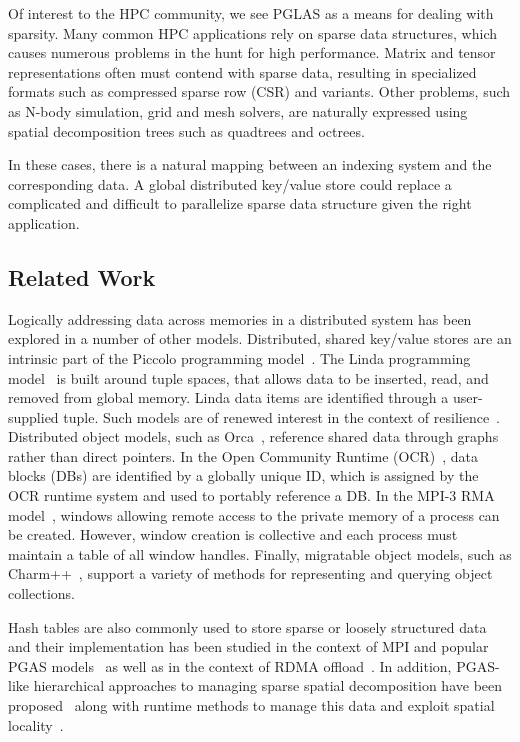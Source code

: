 Of interest to the HPC community, we see PGLAS as a
means for dealing with sparsity. Many common HPC applications rely on
sparse data structures, which causes numerous problems in the hunt for
high performance. Matrix and tensor representations often must contend
with sparse data, resulting in specialized formats such as compressed
sparse row (CSR) and variants. Other problems, such as N-body
simulation, grid and mesh solvers, are naturally expressed using
spatial decomposition trees such as quadtrees and octrees. 

In these cases, there is a natural mapping between an indexing system
and the corresponding data. A global distributed key/value store could
replace a complicated and difficult to parallelize sparse data
structure given the right application.

\vspace{-2mm}

\subsection{Related Work}

Logically addressing data across memories in a distributed
system has been explored in a number of other models.  Distributed,
shared key/value stores are an intrinsic part of the Piccolo
programming model~\cite{power:10}.  The Linda programming
model~\cite{ahuja:86} is built around tuple spaces, that allows data
to be inserted, read, and removed from global memory. Linda data items
are identified through a user-supplied tuple.  Such models are of
renewed interest in the context of resilience~\cite{wilke:14}.
Distributed object models, such as Orca~\cite{bal:92}, reference
shared data through graphs rather than direct pointers.  In the Open
Community Runtime (OCR)~\cite{OCR}, data blocks (DBs) are identified
by a globally unique ID, which is assigned by the OCR runtime system
and used to portably reference a DB.
In the MPI-3 RMA model~\cite{mpi-forum:15}, windows allowing remote
access to the private memory of a process can be created.  However,
window creation is collective and each process must maintain a table of
all window handles.
Finally, migratable object
models, such as Charm++~\cite{kale:93}, support a variety of methods
for representing and querying object collections.

Hash tables are also commonly used to store sparse or loosely structured
data~\cite{memcached04,chord01,docan:12}
and their implementation has been studied in the context of MPI and popular PGAS
models~\cite{zht13,fompi13,cmpi10,maynard:12,memcached12,mht15} as well as in
the context of RDMA offload~\cite{memcached12,mitchell:13,kalia:14}.  In
addition, PGAS-like hierarchical approaches to
managing sparse spatial decomposition have been proposed~\cite{larkins:08}
along with runtime methods to manage this data and exploit spatial
locality~\cite{larkins:12}.

